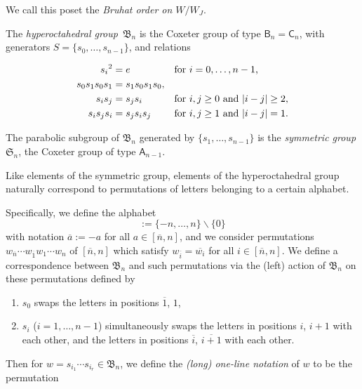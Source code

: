 \documentclass[12pt]{amsart}
\theoremstyle{definition}
\numberwithin{equation}{section}
\newcommand{\sn}{\mathfrak{S}_n}
\newcommand{\bn}{\mathfrak{B}_n}
\newcommand{\ol}[1]{\overline{#1}}
\newcommand{\defeq}{:=}
\newcommand{\ssm}{\smallsetminus}
\newcommand{\msfA}{\mathsf{A}}
\begin{document}
  We call this poset the {\em Bruhat order on $W / W_J$}.

The {\em hyperoctahedral group}
$\,\bn$ is the Coxeter group of type $\mathsf B_n = \mathsf C_n$, with generators $S=\{s_0,\dotsc,s_{n-1}\}$, and relations

\begin{equation}\label{eq:bnpresentation}
  \begin{alignedat}2
    {s_i}^2 &= e &\quad &\text{for $i = 0, \dotsc, n-1$,}\\
    s_0s_1s_0s_1 &= s_1s_0s_1s_0, &\quad & \\
    s_is_j &= s_js_i &\quad &\text{for $i,j \geq 0$ and $|i-j| \geq 2$,}\\
    s_is_js_i &= s_js_is_j &\quad &\text{for $i,j \geq 1$ and $|i-j| = 1$.}
  \end{alignedat}
\end{equation}

The parabolic subgroup of $\bn$ generated by $\{s_1,\dotsc,s_{n-1}\}$ is the {\em symmetric group} $\sn$, the Coxeter group of type $\msfA_{n-1}$.

Like elements of the symmetric group, elements of the hyperoctahedral group naturally correspond to permutations of
letters belonging to a certain alphabet.

Specifically, we define the alphabet
\begin{equation*}
  [\ol n, n] \defeq \{ -n, \dotsc, n \} \ssm \{ 0 \}
  \end{equation*}
with notation $\ol a \defeq -a$ for all $a \in [\ol n,n]$,
and we consider permutations $w_{\ol n} \cdots w_{\ol 1} w_1 \cdots w_n$ of $[\ol n, n]$ which satisfy $w_{\ol i} = \ol{w_i}$ for all $i \in [\ol n, n]$. We define a correspondence between $\bn$ and such permutations via the (left) action of $\bn$ on these permutations defined by
\begin{enumerate}
    \item $s_0$ swaps the letters in positions $\ol1$, $1$,
    \item $s_i$ ($i = 1,\dotsc,n-1$) simultaneously swaps 
    the letters in positions $i$, $i+1$ with each other,
    and
    the letters in positions $\ol i$, $\ol{i+1}$ with each other.
\end{enumerate}
Then for $w = s_{i_1} \cdots s_{i_r} \in \bn$,
we define the {\em (long) one-line notation} of $w$ to be the permutation
\end{document}

